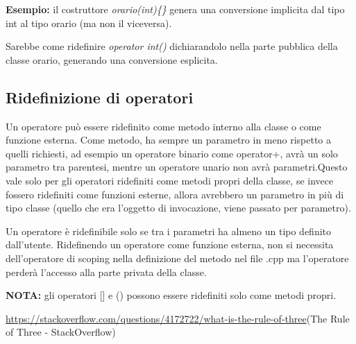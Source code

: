 \textbf{Esempio:} il costruttore \textit{orario(int)\{\}} genera una conversione implicita dal tipo int al tipo orario (ma non il viceversa).

Sarebbe come ridefinire \textit{operator int()} dichiarandolo nella parte pubblica della classe orario, generando una conversione esplicita.

\subsection{Ridefinizione di operatori}
Un operatore può essere ridefinito come metodo interno alla classe o come funzione esterna.
Come metodo, ha sempre un parametro in meno rispetto a quelli richiesti, ad esempio un operatore binario come operator+, avrà un solo parametro tra parentesi, mentre
un operatore unario non avrà parametri.Questo vale solo per gli operatori ridefiniti come metodi propri della classe, se invece fossero ridefiniti come funzioni esterne, allora avrebbero un parametro in più di tipo classe (quello che era l'oggetto di invocazione, viene passato per parametro).

Un operatore è ridefinibile solo se tra i parametri ha almeno un tipo definito dall'utente.
Ridefinendo un operatore come funzione esterna, non si necessita dell'operatore di scoping nella definizione del metodo nel file .cpp ma l'operatore perderà l'accesso alla parte privata della classe.

\textbf{NOTA:} gli operatori [] e () possono essere ridefiniti solo come metodi propri.

\url{https://stackoverflow.com/questions/4172722/what-is-the-rule-of-three}(The Rule of Three - StackOverflow)